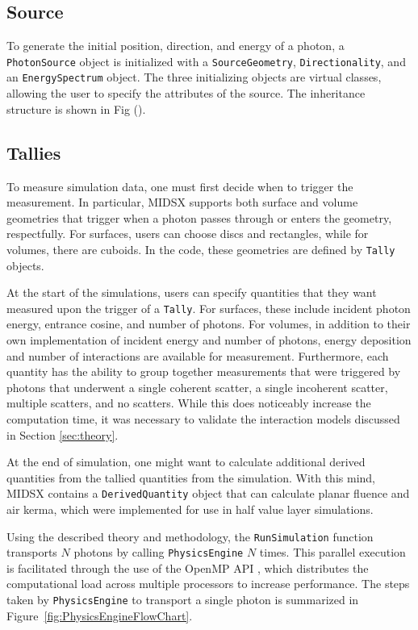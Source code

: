 \subsection{Source}
\par To generate the initial position, direction, and energy of a photon, a \texttt{PhotonSource} object is initialized with a \texttt{SourceGeometry}, \texttt{Directionality}, and an \texttt{EnergySpectrum} object. The three initializing objects are virtual classes, allowing the user to specify the attributes of the source. The inheritance structure is shown in Fig (). 


\subsection{Tallies}
\par To measure simulation data, one must first decide when to trigger the measurement. In particular, MIDSX supports both surface and volume geometries that trigger when a photon passes through or enters the geometry, respectfully. For surfaces, users can choose discs and rectangles, while for volumes, there are cuboids. In the code, these geometries are defined by \texttt{Tally} objects.
\par At the start of the simulations, users can specify quantities that they want measured upon the trigger of a \texttt{Tally}. For surfaces, these include incident photon energy, entrance cosine, and number of photons. For volumes, in addition to their own implementation of incident energy and number of photons, energy deposition and number of interactions are available for measurement. Furthermore, each quantity has the ability to group together measurements that were triggered by photons that underwent a single coherent scatter, a single incoherent scatter, multiple scatters, and no scatters. While this does noticeably increase the computation time, it was necessary to validate the interaction models discussed in Section \ref{sec:theory}.
\par At the end of simulation, one might want to calculate additional derived quantities from the tallied quantities from the simulation. With this mind, MIDSX contains a \texttt{DerivedQuantity} object that can calculate planar fluence and air kerma, which were implemented for use in half value layer simulations.
\vspace{1cm}
\par Using the described theory and methodology, the \texttt{RunSimulation} function transports $N$ photons by calling \texttt{PhysicsEngine} $N$ times. This parallel execution is facilitated through the use of the OpenMP API \cite{dagum1998openmp}, which distributes the computational load across multiple processors to increase performance. The steps taken by \texttt{PhysicsEngine} to transport a single photon is summarized in Figure~\ref{fig:PhysicsEngineFlowChart}.


